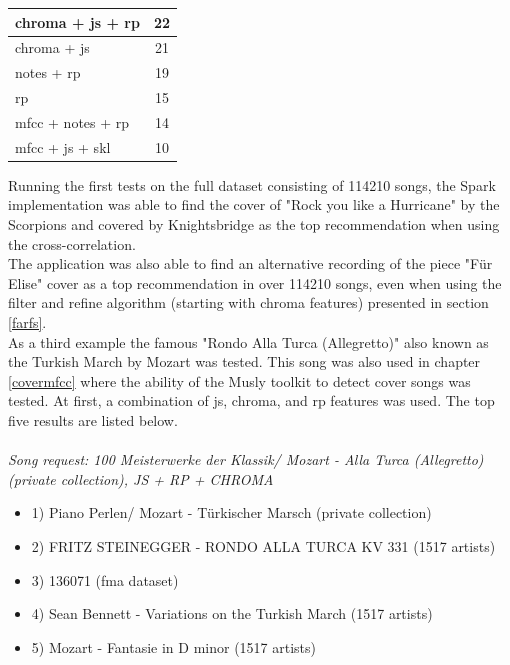 \begin{table}[H]
\begin{minipage}{0.5\textwidth}
\begin{center}
\begin{tabular}{|l||c|}
				\hline
				chroma + js + rp & 22\\
				\hline
				chroma + js & 21\\
				\hline
				notes + rp & 19\\
				\hline
				rp & 15\\
				\hline
				mfcc + notes + rp & 14\\
				\hline
				mfcc + js + skl & 10\\
				\hline
			\end{tabular}
		\end{center}
	\end{minipage}
\end{table}

\noindent Running the first tests on the full dataset consisting of 114210 songs, the Spark implementation was able to find the cover of "Rock you like a Hurricane" by the Scorpions and covered by Knightsbridge as the top recommendation when using the cross-correlation.\\
\noindent The application was also able to find an alternative recording of the piece "Für Elise" cover as a top recommendation in over 114210 songs, even when using the filter and refine algorithm (starting with chroma features) presented in section \ref{farfs}.\\
\noindent As a third example the famous "Rondo Alla Turca (Allegretto)" also known as the Turkish March by Mozart was tested. This song was also used in chapter \ref{covermfcc} where the ability of the Musly toolkit to detect cover songs was tested. 
At first, a combination of js, chroma, and rp features was used. The top five results are listed below.\\
\ \\
\textit{\noindent Song request: 100 Meisterwerke der Klassik/ Mozart - Alla Turca (Allegretto) (private collection), JS + RP + CHROMA}

\begin{itemize}
	\setlength\itemsep{-0.5em}
	\item 1) Piano Perlen/ Mozart - Türkischer Marsch (private collection)
	\item 2) FRITZ STEINEGGER - RONDO ALLA TURCA KV 331 (1517 artists)
	\item 3) 136071 (fma dataset)
	\item 4) Sean Bennett - Variations on the Turkish March (1517 artists)
	\item 5) Mozart - Fantasie in D minor (1517 artists)
\end{itemize}

